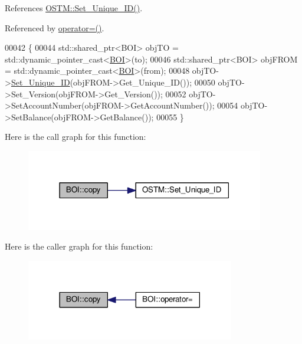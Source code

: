 References \hyperlink{_o_s_t_m_8cpp_source_l00075}{O\+S\+T\+M\+::\+Set\+\_\+\+Unique\+\_\+\+I\+D()}.



Referenced by \hyperlink{_b_o_i_8h_source_l00078}{operator=()}.


\begin{DoxyCode}
00042                                                               \{
00044     std::shared\_ptr<BOI> objTO = std::dynamic\_pointer\_cast<\hyperlink{class_b_o_i}{BOI}>(to);
00046     std::shared\_ptr<BOI> objFROM = std::dynamic\_pointer\_cast<\hyperlink{class_b_o_i}{BOI}>(from);
00048     objTO->\hyperlink{class_o_s_t_m_ab5019a32185631c08abbf826422f2d93_ab5019a32185631c08abbf826422f2d93}{Set\_Unique\_ID}(objFROM->Get\_Unique\_ID());
00050     objTO->Set\_Version(objFROM->Get\_Version());
00052     objTO->SetAccountNumber(objFROM->GetAccountNumber());
00054     objTO->SetBalance(objFROM->GetBalance());
00055 \}
\end{DoxyCode}


Here is the call graph for this function\+:\nopagebreak
\begin{figure}[H]
\begin{center}
\leavevmode
\includegraphics[width=295pt]{class_b_o_i_a9ff2d32c25c23a1bea6316f50c3bf677_a9ff2d32c25c23a1bea6316f50c3bf677_cgraph}
\end{center}
\end{figure}




Here is the caller graph for this function\+:\nopagebreak
\begin{figure}[H]
\begin{center}
\leavevmode
\includegraphics[width=258pt]{class_b_o_i_a9ff2d32c25c23a1bea6316f50c3bf677_a9ff2d32c25c23a1bea6316f50c3bf677_icgraph}
\end{center}
\end{figure}


